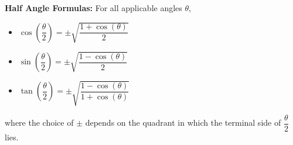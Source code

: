 \smallskip

\colorbox{ResultColor}{\bbm

\begin{thm} \label{halfangle}  \textbf{Half Angle Formulas:} For all applicable angles $\theta$, 

\begin{itemize}

\item  $\cos\left(\dfrac{\theta}{2}\right) = \pm \sqrt{\dfrac{1 + \cos(\theta)}{2}}$

\item  $\sin\left(\dfrac{\theta}{2}\right) = \pm \sqrt{\dfrac{1 - \cos(\theta)}{2}}$

\item  $\tan\left(\dfrac{\theta}{2}\right) = \pm \sqrt{\dfrac{1 - \cos(\theta)}{1+\cos(\theta)}}$

\end{itemize}

\vspace{-.1in}

where the choice of $\pm$ depends on the quadrant in which the terminal side of $\dfrac{\theta}{2}$ lies.

\end{thm}

\ebm}

\smallskip

